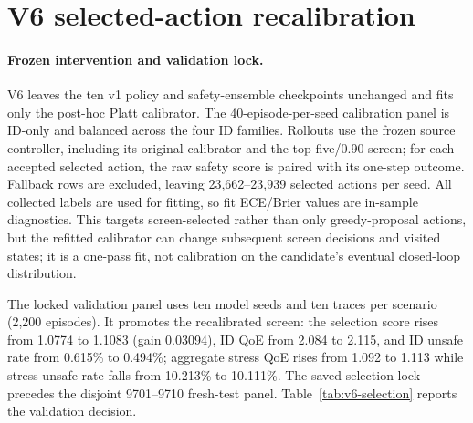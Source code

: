 \documentclass[10pt]{article}
\providecommand{\shieldpath}{generated-shield}
\providecommand{\actioncalpath}{generated-action-calibration-v6}
\begin{document}
\begin{table}[t]
\centering\resizebox{\textwidth}{!}{}
\caption{V5 post-selection action calibration. Entries are means and 95\% bootstrap intervals over source-model seeds; counts are time steps, not independent samples. Proposal scores are paired with their one-step counterfactual safety labels; selected-action scores are paired with the executed action's one-step outcome. Replacement rows condition on changed actions.}
\label{tab:shield-action-calibration}
\end{table}

\section{V6 selected-action recalibration}
\paragraph{Frozen intervention and validation lock.}
V6 leaves the ten v1 policy and safety-ensemble checkpoints unchanged and fits only the post-hoc Platt calibrator. The 40-episode-per-seed calibration panel is ID-only and balanced across the four ID families. Rollouts use the frozen source controller, including its original calibrator and the top-five/0.90 screen; for each accepted selected action, the raw safety score is paired with its one-step outcome. Fallback rows are excluded, leaving 23,662--23,939 selected actions per seed. All collected labels are used for fitting, so fit ECE/Brier values are in-sample diagnostics. This targets screen-selected rather than only greedy-proposal actions, but the refitted calibrator can change subsequent screen decisions and visited states; it is a one-pass fit, not calibration on the candidate's eventual closed-loop distribution.

The locked validation panel uses ten model seeds and ten traces per scenario (2,200 episodes). It promotes the recalibrated screen: the selection score rises from 1.0774 to 1.1083 (gain 0.03094), ID QoE from 2.084 to 2.115, and ID unsafe rate from 0.615\% to 0.494\%; aggregate stress QoE rises from 1.092 to 1.113 while stress unsafe rate falls from 10.213\% to 10.111\%. The saved selection lock precedes the disjoint 9701--9710 fresh-test panel. Table~\ref{tab:v6-selection} reports the validation decision.

\begin{table}[t]
\centering\resizebox{\textwidth}{!}{}
\caption{V6 validation metrics and locked promotion decision. The candidate satisfies the frozen V5 ID, aggregate-risk, family-risk and score-gain constraints.}
\label{tab:v6-selection}
\end{table}
\end{document}
